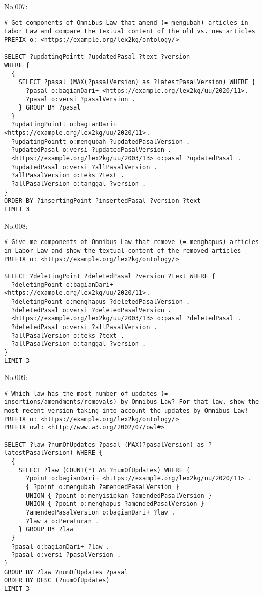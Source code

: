 \noindent No.007:
\begin{lstlisting}
# Get components of Omnibus Law that amend (= mengubah) articles in Labor Law and compare the textual content of the old vs. new articles
PREFIX o: <https://example.org/lex2kg/ontology/>

SELECT ?updatingPointt ?updatedPasal ?text ?version
WHERE {
  {
    SELECT ?pasal (MAX(?pasalVersion) as ?latestPasalVersion) WHERE {
      ?pasal o:bagianDari+ <https://example.org/lex2kg/uu/2020/11>.
      ?pasal o:versi ?pasalVersion .
    } GROUP BY ?pasal
  }
  ?updatingPointt o:bagianDari+ <https://example.org/lex2kg/uu/2020/11>.
  ?updatingPointt o:mengubah ?updatedPasalVersion .
  ?updatedPasal o:versi ?updatedPasalVersion .
  <https://example.org/lex2kg/uu/2003/13> o:pasal ?updatedPasal .
  ?updatedPasal o:versi ?allPasalVersion .
  ?allPasalVersion o:teks ?text .
  ?allPasalVersion o:tanggal ?version .
}
ORDER BY ?insertingPoint ?insertedPasal ?version ?text
LIMIT 3

\end{lstlisting}


\noindent No.008:
\begin{lstlisting}
# Give me components of Omnibus Law that remove (= menghapus) articles in Labor Law and show the textual content of the removed articles
PREFIX o: <https://example.org/lex2kg/ontology/>

SELECT ?deletingPoint ?deletedPasal ?version ?text WHERE {
  ?deletingPoint o:bagianDari+ <https://example.org/lex2kg/uu/2020/11>.
  ?deletingPoint o:menghapus ?deletedPasalVersion .
  ?deletedPasal o:versi ?deletedPasalVersion .
  <https://example.org/lex2kg/uu/2003/13> o:pasal ?deletedPasal .
  ?deletedPasal o:versi ?allPasalVersion .
  ?allPasalVersion o:teks ?text .
  ?allPasalVersion o:tanggal ?version .
}
LIMIT 3

\end{lstlisting}


\noindent No.009:
\begin{lstlisting}
# Which law has the most number of updates (= insertions/amendments/removals) by Omnibus Law? For that law, show the most recent version taking into account the updates by Omnibus Law!
PREFIX o: <https://example.org/lex2kg/ontology/>
PREFIX owl: <http://www.w3.org/2002/07/owl#>

SELECT ?law ?numOfUpdates ?pasal (MAX(?pasalVersion) as ?latestPasalVersion) WHERE {
  {
    SELECT ?law (COUNT(*) AS ?numOfUpdates) WHERE {
      ?point o:bagianDari+ <https://example.org/lex2kg/uu/2020/11> .
      { ?point o:mengubah ?amendedPasalVersion }
      UNION { ?point o:menyisipkan ?amendedPasalVersion }
      UNION { ?point o:menghapus ?amendedPasalVersion }
      ?amendedPasalVersion o:bagianDari+ ?law .
      ?law a o:Peraturan .
    } GROUP BY ?law
  }
  ?pasal o:bagianDari+ ?law .
  ?pasal o:versi ?pasalVersion .
}
GROUP BY ?law ?numOfUpdates ?pasal
ORDER BY DESC (?numOfUpdates)
LIMIT 3

\end{lstlisting}


